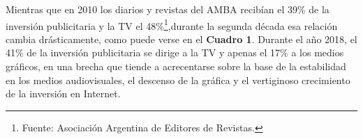 %

Mientras que en 2010 los diarios y revistas del AMBA recibían el 39\% de la inversión publicitaria y la TV el 48\%\footnote{Fuente: Asociación Argentina de Editores de Revistas.},durante la segunda década esa relación cambia drásticamente, como puede verse en el \textbf{Cuadro 1}. Durante el año 2018, el 41\% de la inversión publicitaria se dirige a la TV y apenas el 17\% a los medios gráficos, en una brecha que tiende a acrecentarse sobre la base de la estabilidad en los medios audiovisuales, el descenso de la gráfica y el vertiginoso crecimiento de la inversión en Internet.

